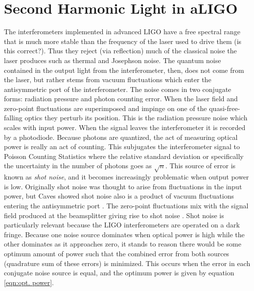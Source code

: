 \documentclass{article}
\begin{document}
\section{Second Harmonic Light in aLIGO}
The interferometers implemented in advanced LIGO have a free spectral range that is much more stable than the frequency of the laser used to drive them (is this correct?).  Thus they reject (via reflection) much of the classical noise the laser produces such as thermal and Josephson noise.  The quantum noise contained in the output light from the interferometer, then, does not come from the laser, but rather stems from vacuum fluctuations which enter the antisymmetric port of the interferometer.  The noise comes in two conjugate forms: radiation pressure and photon counting error.  When the laser field and zero-point fluctuations are superimposed and impinge on one of the quasi-free-falling optics they perturb its position.  This is the radiation pressure noise which scales with input power.  When the signal leaves the interferometer it is recorded by a photodiode.  Because photons are quantized, the act of measuring optical power is really an act of counting.  This subjugates the interferometer signal to Poisson Counting Statistics where the relative standard deviation or specifically the uncertainty in the number of photons goes as $\sqrt{n}$.  This source of error is known as \textit{shot noise}, and it becomes increasingly problematic when output power is low.  Originally shot noise was thought to arise from fluctuations in the input power, but Caves showed shot noise also is a product of vacuum fluctuations entering the antisymmetric port \citep{Caves}.  The zero-point fluctuations mix with the signal field produced at the beamsplitter giving rise to shot noise \cite{LIGOSqueezer}.  Shot noise is particularly relevant because the LIGO interferometers are operated on a dark fringe.  Because one noise source dominates when optical power is high while the other dominates as it approaches zero, it stands to reason there would be some optimum amount of power such that the combined error from both sources (quadrature sum of these errors) is minimized.  This occurs when the error in each conjugate noise source is equal, and the optimum power is given by equation \ref{eqn:opt. power}.
\end{document}
